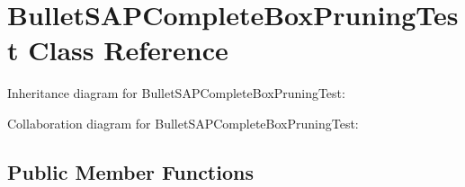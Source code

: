 \hypertarget{class_bullet_s_a_p_complete_box_pruning_test}{\section{Bullet\+S\+A\+P\+Complete\+Box\+Pruning\+Test Class Reference}
\label{class_bullet_s_a_p_complete_box_pruning_test}
}


Inheritance diagram for Bullet\+S\+A\+P\+Complete\+Box\+Pruning\+Test\+:


Collaboration diagram for Bullet\+S\+A\+P\+Complete\+Box\+Pruning\+Test\+:
\subsection*{Public Member Functions}
